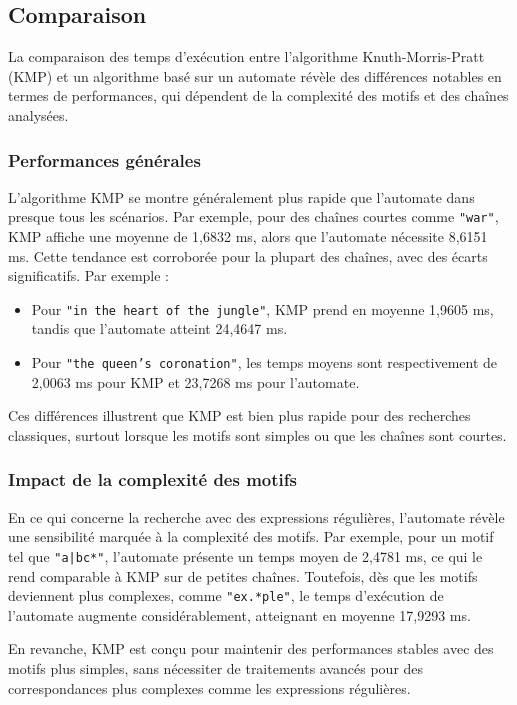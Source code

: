 \documentclass{article}
\begin{document}
\subsection{Comparaison}

La comparaison des temps d'exécution entre l'algorithme Knuth-Morris-Pratt (KMP) et un algorithme basé sur un automate révèle des différences notables en termes de performances, qui dépendent de la complexité des motifs et des chaînes analysées.

\subsubsection{Performances générales}
L'algorithme KMP se montre généralement plus rapide que l'automate dans presque tous les scénarios. Par exemple, pour des chaînes courtes comme \texttt{"war"}, KMP affiche une moyenne de 1,6832 ms, alors que l'automate nécessite 8,6151 ms. Cette tendance est corroborée pour la plupart des chaînes, avec des écarts significatifs. Par exemple :
\begin{itemize}
    \item Pour \texttt{"in the heart of the jungle"}, KMP prend en moyenne 1,9605 ms, tandis que l'automate atteint 24,4647 ms.
    \item Pour \texttt{"the queen’s coronation"}, les temps moyens sont respectivement de 2,0063 ms pour KMP et 23,7268 ms pour l'automate.
\end{itemize}
Ces différences illustrent que KMP est bien plus rapide pour des recherches classiques, surtout lorsque les motifs sont simples ou que les chaînes sont courtes.

\subsubsection{Impact de la complexité des motifs}
En ce qui concerne la recherche avec des expressions régulières, l'automate révèle une sensibilité marquée à la complexité des motifs. Par exemple, pour un motif tel que \texttt{"a|bc*"}, l'automate présente un temps moyen de 2,4781 ms, ce qui le rend comparable à KMP sur de petites chaînes. Toutefois, dès que les motifs deviennent plus complexes, comme \texttt{"ex.*ple"}, le temps d'exécution de l'automate augmente considérablement, atteignant en moyenne 17,9293 ms.

En revanche, KMP est conçu pour maintenir des performances stables avec des motifs plus simples, sans nécessiter de traitements avancés pour des correspondances plus complexes comme les expressions régulières.
\end{document}
